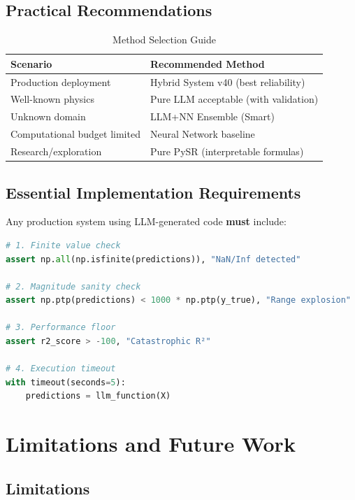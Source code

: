 \documentclass[11pt,a4paper]{article}
\begin{document}
\subsection{Practical Recommendations}

\begin{table}[h]
\centering
\caption{Method Selection Guide}
\begin{tabular}{lp{8cm}}
\toprule
\textbf{Scenario} & \textbf{Recommended Method} \\
\midrule
Production deployment & Hybrid System v40 (best reliability) \\
Well-known physics & Pure LLM acceptable (with validation) \\
Unknown domain & LLM+NN Ensemble (Smart) \\
Computational budget limited & Neural Network baseline \\
Research/exploration & Pure PySR (interpretable formulas) \\
\bottomrule
\end{tabular}
\end{table}

\subsection{Essential Implementation Requirements}

Any production system using LLM-generated code \textbf{must} include:

\begin{lstlisting}[language=Python, caption=Mandatory Validation Checks]
# 1. Finite value check
assert np.all(np.isfinite(predictions)), "NaN/Inf detected"

# 2. Magnitude sanity check
assert np.ptp(predictions) < 1000 * np.ptp(y_true), "Range explosion"

# 3. Performance floor
assert r2_score > -100, "Catastrophic R²"

# 4. Execution timeout
with timeout(seconds=5):
    predictions = llm_function(X)
\end{lstlisting}

\section{Limitations and Future Work}

\subsection{Limitations}
\end{document}
